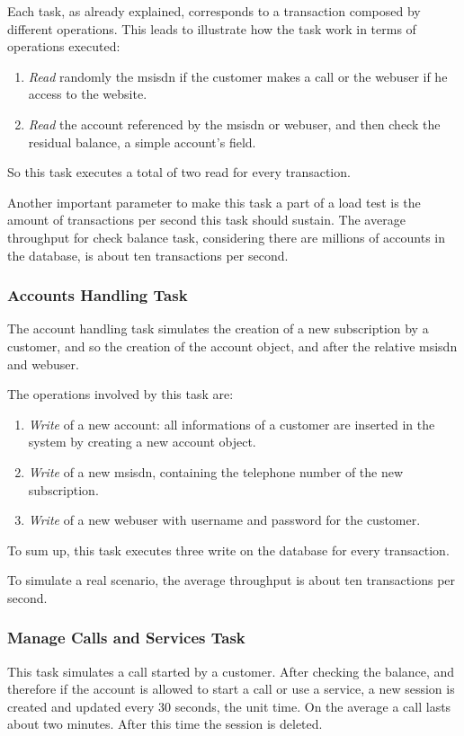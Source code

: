 Each task, as already explained, corresponds to a transaction composed by different operations. This leads to illustrate how the task work in terms of operations executed:
\begin{enumerate}
	\item \emph{Read} randomly the msisdn if the customer makes a call or the webuser if he access to the website.
	\item \emph{Read} the account referenced by the msisdn or webuser, and then check the residual balance, a simple account's field.
\end{enumerate}
So this task executes a total of two read for every transaction.

Another important parameter to make this task a part of a load test is the amount of transactions per second this task should sustain. The average throughput for check balance task, considering there are millions of accounts in the database, is about ten transactions per second.

			\subsubsection{Accounts Handling Task}
The account handling task simulates the creation of a new subscription by a customer, and so the creation of the account object, and after the relative msisdn and webuser. 

The operations involved by this task are:
\begin{enumerate}
	\item \emph{Write} of a new account: all informations of a customer are inserted in the system by creating a new account object.
	\item \emph{Write} of a new msisdn, containing the telephone number of the new subscription.
	\item \emph{Write} of a new webuser with username and password for the customer.
\end{enumerate}
To sum up, this task executes three write on the database for every transaction.

To simulate a real scenario, the average throughput is about ten transactions per second.

			\subsubsection{Manage Calls and Services Task}
This task simulates a call started by a customer. After checking the balance, and therefore if the account is allowed to start a call or use a service, a new session is created and updated every 30 seconds, the unit time. On the average a call lasts about two minutes. After this time the session is deleted.

